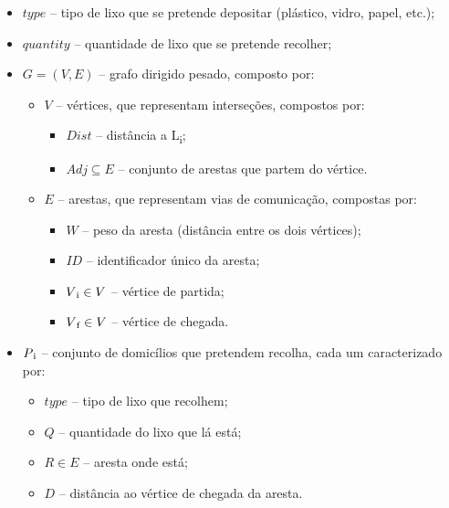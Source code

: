 \documentclass[article, a4paper, 12pt, oneside]{memoir}
\begin{document}
\begin{itemize} %

\item $type$ – tipo de lixo que se pretende depositar (plástico, vidro, papel, etc.);
\item $quantity$ – quantidade de lixo que se pretende recolher;
\item $G = (V, E)$ – grafo dirigido pesado, composto por:

	\begin{itemize} %

	\item $V$ – vértices, que representam interseções, compostos por:

		\begin{itemize} %
		\item $Dist$ – distância a L\textsubscript{i};
		\item $Adj \subseteq E$ – conjunto de arestas que partem do vértice.
		\end{itemize} %

	\end{itemize} %

	\begin{itemize} %

	\item $E$ – arestas, que representam vias de comunicação, compostas por:

		\begin{itemize} %
		\item $W$ – peso da aresta (distância entre os dois vértices);
		\item $ID$ – identificador único da aresta;
		\item $V\textsubscript{i} \in V$ – vértice de partida;
		\item $V\textsubscript{f} \in V$ – vértice de chegada.
		\end{itemize} %

	\end{itemize} %

\item $P\textsubscript{i}$ – conjunto de domicílios que pretendem recolha, cada um caracterizado por:

	\begin{itemize} %

	\item $type$ – tipo de lixo que recolhem;
	\item $Q$ – quantidade do lixo que lá está;
	\item $R \in E$ – aresta onde está;
	\item $D$ – distância ao vértice de chegada da aresta.


\end{itemize}
\end{itemize}
\end{document}
